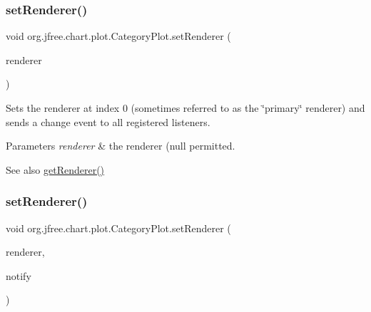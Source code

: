 \subsubsection{\texorpdfstring{set\+Renderer()}{setRenderer()}\hspace{0.1cm}{\footnotesize\ttfamily [1/4]}}
{\footnotesize\ttfamily void org.\+jfree.\+chart.\+plot.\+Category\+Plot.\+set\+Renderer (\begin{DoxyParamCaption}\item[{\mbox{\hyperlink{interfaceorg_1_1jfree_1_1chart_1_1renderer_1_1category_1_1_category_item_renderer}{Category\+Item\+Renderer}}}]{renderer }\end{DoxyParamCaption})}

Sets the renderer at index 0 (sometimes referred to as the \char`\"{}primary\char`\"{} renderer) and sends a change event to all registered listeners.


\begin{DoxyParams}{Parameters}
{\em renderer} & the renderer ({\ttfamily null} permitted.\\
\hline
\end{DoxyParams}
\begin{DoxySeeAlso}{See also}
\mbox{\hyperlink{classorg_1_1jfree_1_1chart_1_1plot_1_1_category_plot_aa00ab3d14f76887f00095323f2538d14}{get\+Renderer()}} 
\end{DoxySeeAlso}
\mbox{\label{classorg_1_1jfree_1_1chart_1_1plot_1_1_category_plot_a12b7397d6ce4aeee471f05c3d37cb711}} 
\subsubsection{\texorpdfstring{set\+Renderer()}{setRenderer()}\hspace{0.1cm}{\footnotesize\ttfamily [2/4]}}
{\footnotesize\ttfamily void org.\+jfree.\+chart.\+plot.\+Category\+Plot.\+set\+Renderer (\begin{DoxyParamCaption}\item[{\mbox{\hyperlink{interfaceorg_1_1jfree_1_1chart_1_1renderer_1_1category_1_1_category_item_renderer}{Category\+Item\+Renderer}}}]{renderer,  }\item[{boolean}]{notify }\end{DoxyParamCaption})}

